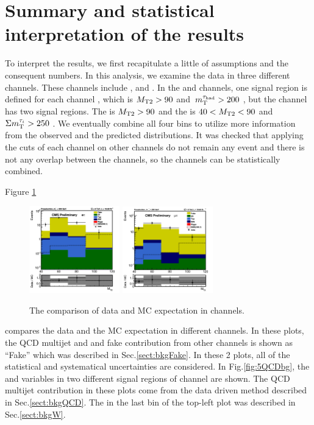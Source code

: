 \section{Summary and statistical interpretation of the results}
\label{sect:stat}
To interpret the results, we first recapitulate a little of assumptions and the consequent numbers.
In this analysis, we examine the data in three different channels.
These channels include \tauTau, \muTau and \eTau.
In the \muTau and \eTau channels, one signal region is defined for each channel , which is ${M_{\rm T2}} > 90$ \GeV and $\,m_{\rm T}^{\tau_{\rm had}} > 200$ \GeV,
but the \tauTau channel has two signal regions.
The \binone is ${M_{\rm T2}} > 90$ \GeV and the \bintwo is $40 < {M_{\rm T2}} < 90$ \GeV and $\Sigma m_{\rm T}^{\tau_i} > 250$ \GeV.
We eventually combine all four bins to utilize more information from the observed and the predicted distributions.
It was checked that applying the cuts of each channel on other channels do not remain any event and 
there is not any overlap between the channels, so the channels can be statistically combined.

Figure \ref{fig:yield_final}
\begin{figure}[h]
\centering
\includegraphics[width=0.35\textwidth,keepaspectratio=true]{StatisticsFig/MT2_tauMTgt200_DDFakeEleTau.png}
\includegraphics[width=0.35\textwidth,keepaspectratio=true]{StatisticsFig/MT2muTau_tauMTgt200_DDFake.png}
\caption{The comparison of data and MC expectation in \leptonTau channels.}
\label{fig:yield_final}
\end{figure}
compares the data and the MC expectation in different \leptonTau channels. 
In these plots, the QCD multijet and \wjets and fake contribution from other channels is shown 
as ``Fake'' which was described in Sec.\ref{sect:bkgFake}. 
In these 2 plots, all of the statistical and systematical uncertainties are considered.
In Fig.\ref{fig:5QCDbg}, the \mttwo and \SumMT variables in two 
different signal regions of \tauTau channel are shown. The QCD multijet contribution in these plots come from the data driven method described in 
Sec.\ref{sect:bkgQCD}. The \wjets in the last bin of the top-left plot was described in Sec.\ref{sect:bkgW}. 

